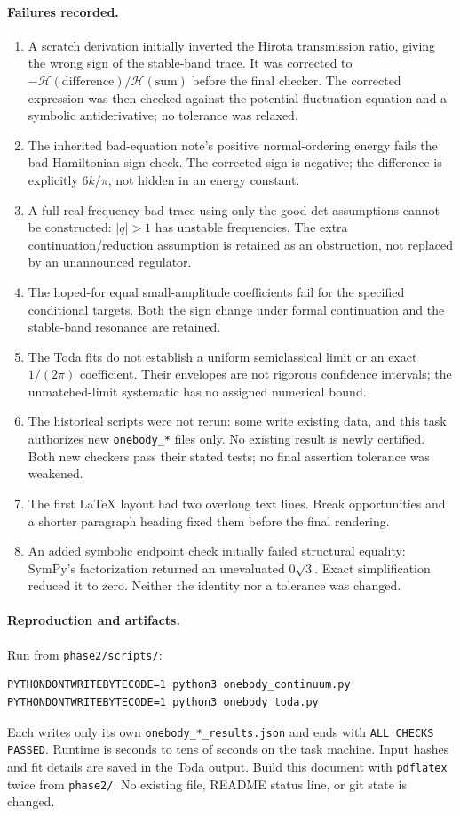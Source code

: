 \documentclass[11pt,a4paper]{article}
\begin{document}
\paragraph{Failures recorded.}
\begin{enumerate}
\item A scratch derivation initially inverted the Hirota transmission ratio,
giving the wrong sign of the stable-band trace. It was corrected to
$-\mathcal H(\mathrm{difference})/\mathcal H(\mathrm{sum})$ before the
final checker. The corrected expression was then checked against the
potential fluctuation equation and a symbolic antiderivative; no tolerance
was relaxed.
\item The inherited bad-equation note's positive normal-ordering energy
fails the bad Hamiltonian sign check. The corrected sign is negative;
the difference is explicitly $6k/\pi$, not hidden in an energy constant.
\item A full real-frequency bad trace using only the good det assumptions
cannot be constructed: $|q|>1$ has unstable frequencies. The extra
continuation/reduction assumption is retained as an obstruction, not
replaced by an unannounced regulator.
\item The hoped-for equal small-amplitude coefficients fail for the
specified conditional targets. Both the sign change under formal
continuation and the stable-band resonance are retained.
\item The Toda fits do not establish a uniform semiclassical limit or an
exact $1/(2\pi)$ coefficient. Their envelopes are not rigorous confidence
intervals; the unmatched-limit systematic has no assigned numerical bound.
\item The historical scripts were not rerun: some write existing data, and
this task authorizes new \texttt{onebody\_*} files only. No existing result
is newly certified. Both new checkers pass their stated tests; no final
assertion tolerance was weakened.
\item The first LaTeX layout had two overlong text lines. Break opportunities
and a shorter paragraph heading fixed them before the final rendering.
\item An added symbolic endpoint check initially failed structural equality:
SymPy's factorization returned an unevaluated $0\sqrt3$. Exact simplification
reduced it to zero. Neither the identity nor a tolerance was changed.
\end{enumerate}

\paragraph{Reproduction and artifacts.}
Run from \texttt{phase2/scripts/}:
\begin{verbatim}
PYTHONDONTWRITEBYTECODE=1 python3 onebody_continuum.py
PYTHONDONTWRITEBYTECODE=1 python3 onebody_toda.py
\end{verbatim}
Each writes only its own \texttt{onebody\_*\_results.json} and ends with
\texttt{ALL CHECKS PASSED}. Runtime is seconds to tens of seconds on the
task machine. Input hashes and fit details are saved in the Toda output.
Build this document with \texttt{pdflatex} twice from \texttt{phase2/}.
No existing file, README status line, or git state is changed.
\end{document}
